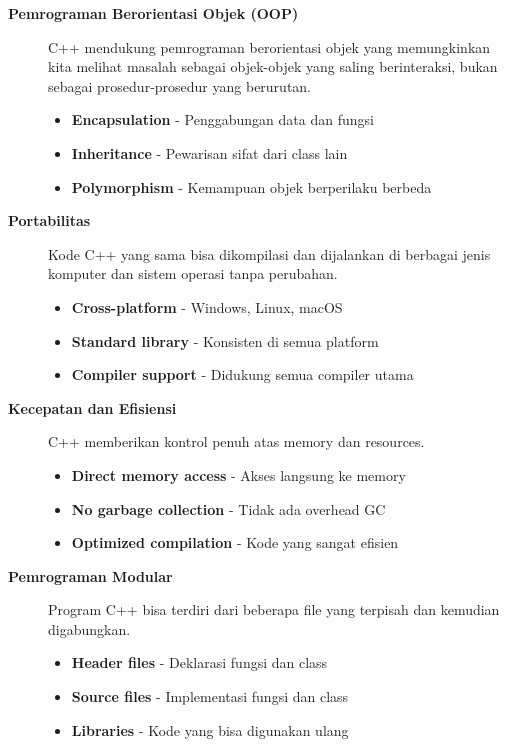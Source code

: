 \begin{description}

\item[\textbf{Pemrograman Berorientasi Objek (OOP)}]
C++ mendukung pemrograman berorientasi objek yang memungkinkan kita melihat masalah sebagai objek-objek yang saling berinteraksi, bukan sebagai prosedur-prosedur yang berurutan.

\begin{itemize}
\item \textbf{Encapsulation} - Penggabungan data dan fungsi
\item \textbf{Inheritance} - Pewarisan sifat dari class lain
\item \textbf{Polymorphism} - Kemampuan objek berperilaku berbeda
\end{itemize}

\item[\textbf{Portabilitas}]
Kode C++ yang sama bisa dikompilasi dan dijalankan di berbagai jenis komputer dan sistem operasi tanpa perubahan.

\begin{itemize}
\item \textbf{Cross-platform} - Windows, Linux, macOS
\item \textbf{Standard library} - Konsisten di semua platform
\item \textbf{Compiler support} - Didukung semua compiler utama
\end{itemize}

\item[\textbf{Kecepatan dan Efisiensi}]
C++ memberikan kontrol penuh atas memory dan resources.

\begin{itemize}
\item \textbf{Direct memory access} - Akses langsung ke memory
\item \textbf{No garbage collection} - Tidak ada overhead GC
\item \textbf{Optimized compilation} - Kode yang sangat efisien
\end{itemize}

\item[\textbf{Pemrograman Modular}]
Program C++ bisa terdiri dari beberapa file yang terpisah dan kemudian digabungkan.

\begin{itemize}
\item \textbf{Header files} - Deklarasi fungsi dan class
\item \textbf{Source files} - Implementasi fungsi dan class
\item \textbf{Libraries} - Kode yang bisa digunakan ulang
\end{itemize}


\end{description}
